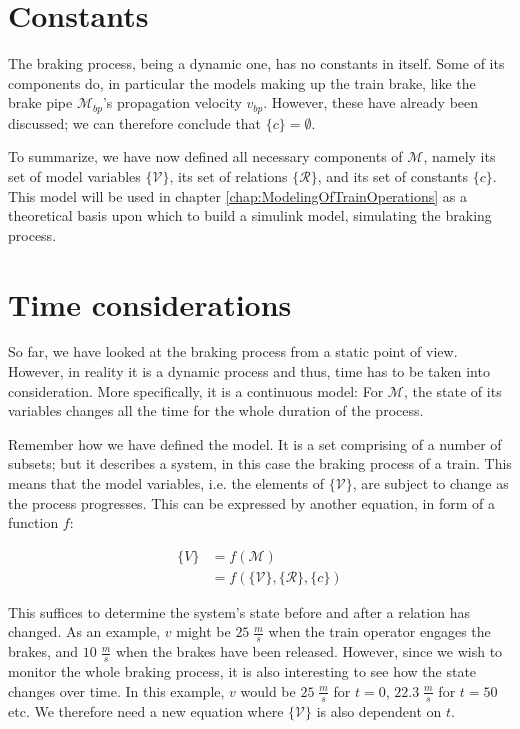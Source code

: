 \section{Constants}
\label{sec:Constants}
\par\noindent
The braking process, being a dynamic one, has no constants in itself. Some of its components do, in particular the models making up the train brake, like the brake pipe ${\mathcal{M}}_{bp}$'s propagation velocity $v_{bp}$. However, these have already been discussed; we can therefore conclude that $\{ c \} = \emptyset$.
\bigskip
\par\noindent
To summarize, we have now defined all necessary components of ${\mathcal{M}}$, namely its set of model variables $\{{\mathcal{V}}\}$, its set of relations $\{{\mathcal{R}}\}$, and its set of constants $\{c\}$. This model will be used in chapter \ref{chap:ModelingOfTrainOperations} as a theoretical basis upon which to build a simulink model, simulating the braking process.

\section{Time considerations}
\label{sec:TimeConsiderations}
\par\noindent
So far, we have looked at the braking process from a static point of view. However, in reality it is a dynamic process and thus, time has to be taken into consideration. More specifically, it is a continuous model: For ${\mathcal{M}}$, the state of its variables changes all the time for the whole duration of the process. 
\par
Remember how we have defined the model. It is a set comprising of a number of subsets; but it describes a system, in this case the braking process of a train. This means that the model variables, i.e. the elements of $\{{\mathcal{V}}\}$, are subject to change as the process progresses. This can be expressed by another equation, in form of a function $f$:

\begin{align*}
\{ V \} &= f( {\mathcal{M}} ) \\
		&= f( \{ {\mathcal{V}} \}, \{ {\mathcal{R}} \}, \{ c \} )
\end{align*}

\noindent
This suffices to determine the system's state before and after a relation has changed. As an example, $v$ might be $25 \; \frac{m}{s}$ when the train operator engages the brakes, and $10 \; \frac{m}{s}$ when the brakes have been released. However, since we wish to monitor the whole braking process, it is also interesting to see how the state changes over time. In this example, $v$ would be $25 \; \frac{m}{s}$ for $t=0$, $22.3 \; \frac{m}{s}$ for $t=50$ etc. We therefore need a new equation where $\{ {\mathcal{V}} \}$ is also dependent on $t$.

